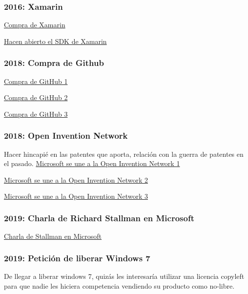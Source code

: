 \documentclass[10pt, titlepage]{article}
\begin{document}
\subsubsection{2016: Xamarin}
\href{https://www.genbeta.com/desarrollo/microsoft-adquiere-xamarin}{Compra de Xamarin}

\href{https://www.petri.com/microsofts-newly-acquired-xamarin-expands-developer-tools-new-features}{Hacen abierto el SDK de Xamarin}

\subsubsection{2018: Compra de Github}
\href{https://www.xataka.com/aplicaciones/oficial-microsoft-compra-github-7-500-millones-dolares}{Compra de GitHub 1}

\href{https://www.elconfidencial.com/tecnologia/2018-06-04/microsoft-ahora-ama-el-software-libre-compra-la-startup-github-por-7-500-millones_1573704/}{Compra de GitHub 2}

\href{https://www.xataka.com/aplicaciones/microsoft-punto-adquirir-github-desarrolladores-desarrolladores-desarrolladores}{Compra de GitHub 3}

\subsubsection{2018: Open Invention Network}
Hacer hincapié en las patentes que aporta, relación con la guerra de patentes en el pasado.
\href{https://azure.microsoft.com/en-us/blog/microsoft-joins-open-invention-network-to-help-protect-linux-and-open-source/}{Microsoft se une a la Open Invention Network 1}

\href{https://www.zdnet.com/article/what-does-microsoft-joining-the-open-invention-network-mean-for-you/}{Microsoft se une a la Open Invention Network 2}

\href{https://www.muycomputerpro.com/2018/10/10/microsoft-se-une-a-open-invention-network}{Microsoft se une a la Open Invention Network 3}

\subsubsection{2019: Charla de Richard Stallman en Microsoft}
\href{https://stallman.org/articles/microsoft-talk.html}{Charla de Stallman en Microsoft}

\subsubsection{2019: Petición de liberar Windows 7}
De llegar a liberar windows 7, quizás les interesaría utilizar una licencia copyleft para que nadie les hiciera competencia vendiendo su producto como no-libre.
\end{document}
